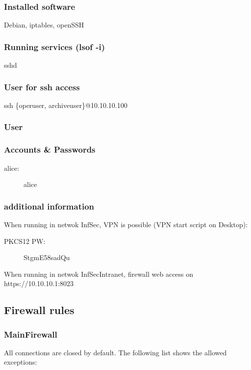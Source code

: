 \documentclass[a4paper, toc=index, 12pt, DIV14, twoside, BCOR2cm, headsepline, numbers=noenddot, bibliography=totoc]{report}
\begin{document}
\subsubsection*{Installed software}
Debian, iptables, openSSH
\subsubsection*{Running services (lsof -i)}
sshd
\subsubsection*{User for ssh access}
ssh \{operuser, archiveuser\}@10.10.10.100

\subsubsection{User}
\subsubsection*{Accounts \& Passwords}
\begin{description}
\item[alice:] alice
\end{description}
\subsubsection*{additional information}
When running in netwok InfSec, VPN is possible (VPN start script on Desktop):\newline
\begin{description}
\item[PKCS12 PW:] StgmE58sadQu
\end{description}
When running in netwok InfSecIntranet, firewall web access on https://10.10.10.1:8023


\subsection{Firewall rules}
\subsubsection{MainFirewall}
All connections are closed by default. The following list shows the allowed exceptions:\newline
\end{document}
